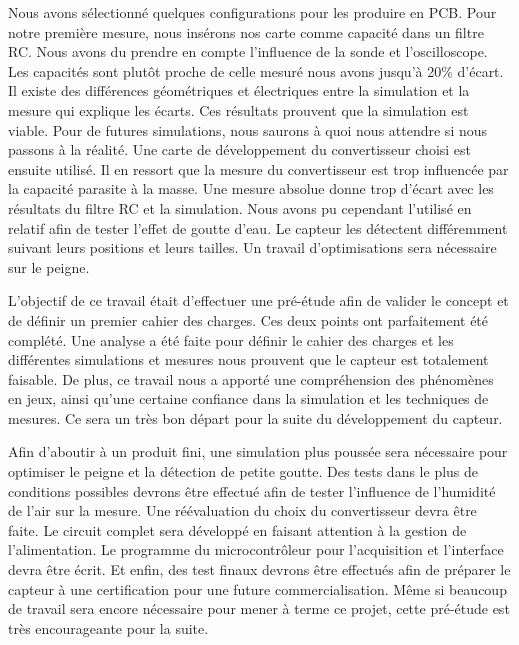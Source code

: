 Nous avons sélectionné quelques configurations pour les produire en PCB. Pour notre première mesure, nous insérons nos carte comme capacité dans un filtre RC. Nous avons du prendre en compte l’influence de la sonde et l'oscilloscope. Les capacités sont plutôt proche de celle mesuré nous avons jusqu'à 20\% d'écart. Il existe des différences géométriques et électriques entre la simulation et la mesure qui explique les écarts. Ces résultats prouvent que la simulation est viable. Pour de futures simulations, nous saurons à quoi nous attendre si nous passons à la réalité. Une carte de développement du convertisseur choisi est ensuite utilisé. Il en ressort que la mesure du convertisseur est trop influencée par la capacité parasite à la masse. Une mesure absolue donne trop d'écart avec les résultats du filtre RC et la simulation. Nous avons pu cependant l'utilisé en relatif afin de tester l'effet de goutte d'eau. Le capteur les détectent différemment suivant leurs positions et leurs tailles. Un travail d'optimisations sera nécessaire sur le peigne.

L'objectif de ce travail était d'effectuer une pré-étude afin de valider le concept et de définir un premier cahier des charges. Ces deux points ont parfaitement été complété. Une analyse a été faite pour définir le cahier des charges et les différentes simulations et mesures nous prouvent que le capteur est totalement faisable. De plus, ce travail nous a apporté une compréhension des phénomènes en jeux, ainsi qu'une certaine confiance dans la simulation et les techniques de mesures. Ce sera un très bon départ pour la suite du développement du capteur.

Afin d'aboutir à un produit fini, une simulation plus poussée sera nécessaire pour optimiser le peigne et la détection de petite goutte. Des tests dans le plus de conditions possibles devrons être effectué afin de tester l’influence de l'humidité de l'air sur la mesure. Une réévaluation du choix du convertisseur devra être faite. Le circuit complet sera développé en faisant attention à la gestion de l'alimentation. Le programme du microcontrôleur pour l'acquisition et l'interface devra être écrit. Et enfin, des test finaux devrons être effectués afin de préparer le capteur à une certification pour une future commercialisation. Même si beaucoup de travail sera encore nécessaire pour mener à terme ce projet, cette pré-étude est très encourageante pour la suite. 
